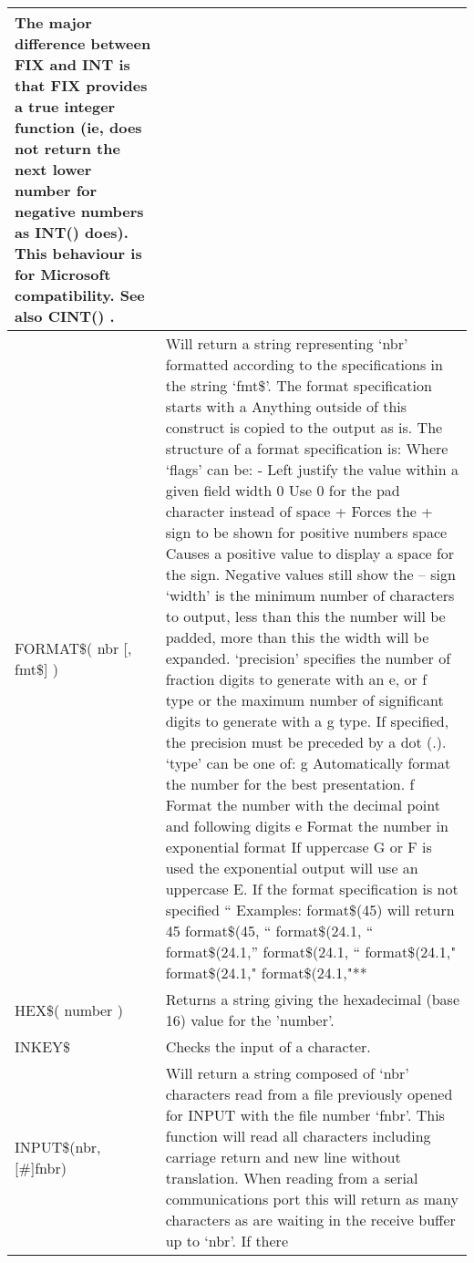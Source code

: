 \documentclass[11pt,fleqn]{book} %
\numberwithin{equation}{section} %
\numberwithin{figure}{section} %
\numberwithin{table}{section} %
\begin{document}
\begin{table}[]
\begin{tabular}{|p{4cm}|p{10cm}|}
The major difference between FIX and INT is that FIX provides a true
integer function (ie, does not return the next lower number for negative
numbers as INT() does). This behaviour is for Microsoft compatibility.
See also CINT() .
\\ \hline
FORMAT\$( nbr [, fmt\$] ) & Will return a string representing ‘nbr’ formatted according to the
specifications in the string ‘fmt\$’.
The format specification starts with a %
Anything outside of this construct is copied to the output as is.
The structure of a format specification is:
Where ‘flags’ can be:
-
Left justify the value within a given field width
0
Use 0 for the pad character instead of space
+
Forces the + sign to be shown for positive numbers
space
Causes a positive value to display a space for the sign.
Negative values still show the – sign
‘width’ is the minimum number of characters to output, less than this the
number will be padded, more than this the width will be expanded.
‘precision’ specifies the number of fraction digits to generate with an e,
or f type or the maximum number of significant digits to generate with a
g type. If specified, the precision must be preceded by a dot (.).
‘type’ can be one of:
g
Automatically format the number for the best presentation.
f
Format the number with the decimal point and following
digits
e
Format the number in exponential format
If uppercase G or F is used the exponential output will use an uppercase
E. If the format specification is not specified “%
Examples:
format\$(45) will return 45
format\$(45, “%
format\$(24.1, “%
format\$(24.1,”%
format\$(24.1, “%
format\$(24.1,"%
format\$(24.1,"%
format\$(24.1,"**%
\\ \hline
HEX\$( number ) & Returns a string giving the hexadecimal (base 16) value for the 'number'.
\\ \hline
INKEY\$ & Checks the input of a character.
\\ \hline
INPUT\$(nbr, [\#]fnbr) & Will return a string composed of ‘nbr’ characters read from a file
previously opened for INPUT with the file number ‘fnbr’. This function
will read all characters including carriage return and new line without
translation.
When reading from a serial communications port this will return as
many characters as are waiting in the receive buffer up to ‘nbr’. If there

\end{tabular}
\end{table}
\end{document}
